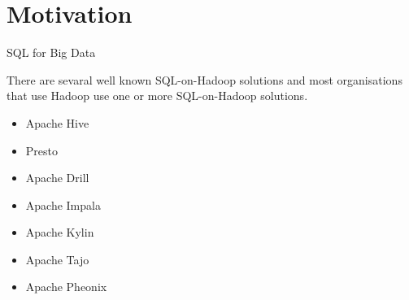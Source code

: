 \documentclass[newPxFont]{beamer}
\renewcommand{\event}[3][e]{%
  \pgfmathsetlength\xstop{(#2-\theyearstart)*\unit}%
  \ifx #1e%
    \draw[fill=black,draw=none,opacity=0.5]%
      (\xstop, 0) circle (.2\unit)%
      node[opacity=1,rotate=45,right=.2\unit] {#3};%
  \else%
    \pgfmathsetlength\xstart{(#1-\theyearstart)*\unit}%
    \draw[fill=black,draw=none,opacity=0.5,rounded corners=.1\unit]%
      (\xstart,-.1\unit) rectangle%
      node[opacity=1,rotate=45,right=.2\unit] {#3} (\xstop,.1\unit);%
  \fi}%
\begin{document}





%
%

\section*{Motivation}


\begin{frame}{SQL for Big Data}

There are sevaral well known SQL-on-Hadoop solutions and most organisations that use Hadoop use one or more SQL-on-Hadoop solutions.

\begin{itemize}
	\item Apache Hive
	\item Presto
	\item Apache Drill
	\item Apache Impala
	\item Apache Kylin
	\item Apache Tajo
	\item Apache Pheonix
\end{itemize}

\end{frame}
\end{document}
